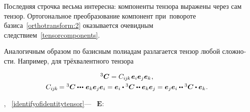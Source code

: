 \begin{otherlanguage}{russian}

\vspace{-0.2em}\noindent
Последняя строчка весьма интересна: компоненты тензора выражены через сам тензор. Ортогональное преобразование компонент при~повороте базиса~\eqref{orthotransform:2} оказывается очевидным следствием~\eqref{tensorcomponents}.

Аналогичным образом по базисным полиадам разлагается тензор любой сложности. Например, для трёхвалентного тензора

\nopagebreak\begin{equation}\label{polyada:3}
\begin{array}{c}
{^3\!\,\bm{C}} = C_{i\hspace{-0.1ex}j\hspace{-0.1ex}k} \hspace{.2ex} \bm{e}_i \bm{e}_j \bm{e}_k \hspace{.1ex},
\\[.8ex]
C_{i\hspace{-0.1ex}j\hspace{-0.1ex}k} \hspace{-0.2ex} = {^3\!\,\bm{C}} \dotdotdotp \bm{e}_k \bm{e}_j \bm{e}_i = \bm{e}_i \dotp {^3\!\,\bm{C}} \dotdotp \bm{e}_k \bm{e}_j = \bm{e}_j \bm{e}_i \dotdotp {^3\!\,\bm{C}} \dotp \bm{e}_k \hspace{.1ex}.
\end{array}
\end{equation}

\end{otherlanguage}

 ,   ~\eqref{identifyofidentitytensor}\:---  ~$\bm{E}$:


